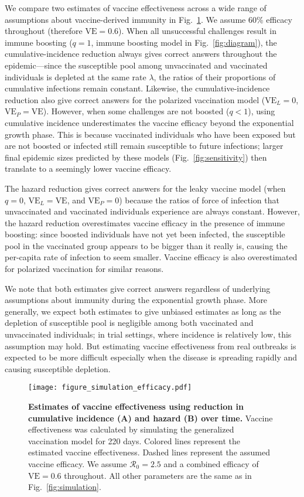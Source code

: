 \documentclass[12pt]{article}
\newcommand{\fref}[1]{Fig.~\ref{fig:#1}}
\newcommand{\Rx}[1]{\ensuremath{{\mathcal R}_{#1}}\xspace}
\newcommand{\Ro}{\Rx{0}}
\newcommand{\VE}{\ensuremath{\textrm{VE}}}
\begin{document}
We compare two estimates of vaccine effectiveness across a wide range of assumptions about vaccine-derived immunity in \fref{efficacy}.
We assume 60\% efficacy throughout (therefore $\VE = 0.6$).
When all unsuccessful challenges result in immune boosting ($q=1$, immune boosting model in \fref{diagram}), the cumulative-incidence reduction always gives correct answers throughout the epidemic---since the susceptible pool among unvaccinated and vaccinated individuals is depleted at the same rate $\lambda$, the ratios of their proportions of cumulative infections remain constant.
Likewise, the cumulative-incidence reduction also give correct answers for the polarized vaccination model ($\VE_L = 0$, $\VE_P = \VE$).
However, when some challenges are not boosted ($q < 1$), using cumulative incidence underestimates the vaccine efficacy beyond the exponential growth phase.
This is because vaccinated individuals who have been exposed but are not boosted or infected still remain susceptible to future infections; 
larger final epidemic sizes predicted by these models (\fref{sensitivity}) then translate to a seemingly lower vaccine efficacy.

The hazard reduction gives correct answers for the leaky vaccine model (when $q=0$, $\VE_L = \VE$, and $\VE_P = 0$) because the ratios of force of infection that unvaccinated and vaccinated individuals experience are always constant.
However, the hazard reduction overestimates vaccine efficacy in the presence of immune boosting: since boosted individuals have not yet been infected, the susceptible pool in the vaccinated group appears to be bigger than it really is, causing the per-capita rate of infection to seem smaller.
Vaccine efficacy is also overestimated for polarized vaccination for similar reasons.

We note that both estimates give correct answers regardless of underlying assumptions about immunity during the exponential growth phase.
More generally, we expect both estimates to give unbiased estimates as long as the depletion of susceptible pool is negligible among both vaccinated and unvaccinated individuals;
in trial settings, where incidence is relatively low, this assumption may hold.
But estimating vaccine effectiveness from real outbreaks is expected to be more difficult especially when the disease is spreading rapidly and causing susceptible depletion.

\begin{figure}[!th]
\texttt{[image: figure\_simulation\_efficacy.pdf]}
\caption{
\textbf{Estimates of vaccine effectiveness using reduction in cumulative incidence (A) and hazard (B) over time.}
Vaccine effectiveness was calculated by simulating the generalized vaccination model for 220 days. 
Colored lines represent the estimated vaccine effectiveness.
Dashed lines represent the assumed vaccine efficacy.
We assume $\Ro = 2.5$ and a combined efficacy of $\VE = 0.6$ throughout. 
All other parameters are the same as in \fref{simulation}.
\label{fig:efficacy}
}
\end{figure}
\end{document}
